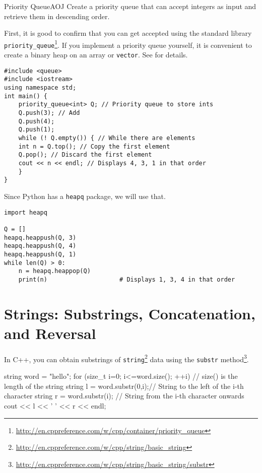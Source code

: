 \begin{psbox}{Priority Queue}{AOJ}
Create a priority queue that can accept integers as input and retrieve them in descending order.

\end{psbox}

First, it is good to confirm that you can get accepted using the standard library \texttt{priority\_queue}\footnote{\url{http://en.cppreference.com/w/cpp/container/priority_queue}}.
If you implement a priority queue yourself, it is convenient to create a binary heap on an array or \texttt{vector}. See \pcaojbook[Chapter 10, pp.~232--] for details.

\begin{cbox}[emph={queue,priority\_queue,push,top,pop}]
\begin{verbatim}
#include <queue>
#include <iostream>
using namespace std;
int main() {
    priority_queue<int> Q; // Priority queue to store ints
    Q.push(3); // Add
    Q.push(4);
    Q.push(1);
    while (! Q.empty()) { // While there are elements
	int n = Q.top(); // Copy the first element
	Q.pop(); // Discard the first element
	cout << n << endl; // Displays 4, 3, 1 in that order
    }
}
\end{verbatim}
\end{cbox}

Since Python has a \texttt{heapq} package, we will use that.
\begin{pybox}
\begin{verbatim}
import heapq

Q = []
heapq.heappush(Q, 3)
heapq.heappush(Q, 4)
heapq.heappush(Q, 1)
while len(Q) > 0:
    n = heapq.heappop(Q)
    print(n)                    # Displays 1, 3, 4 in that order
\end{verbatim}
\end{pybox}
\section{Strings: Substrings, Concatenation, and Reversal}
In C++, you can obtain substrings of \texttt{string}\footnote{\url{http://en.cppreference.com/w/cpp/string/basic_string}} data using the \texttt{substr} method\footnote{\url{http://en.cppreference.com/w/cpp/string/basic_string/substr}}.
\begin{cbox}
  string word = "hello";
  for (size_t i=0; i<=word.size(); ++i) { // size() is the length of the string
    string l = word.substr(0,i);// String to the left of the i-th character
    string r = word.substr(i); // String from the i-th character onwards
    cout << l << ' ' << r << endl;
  }
\end{cbox}


